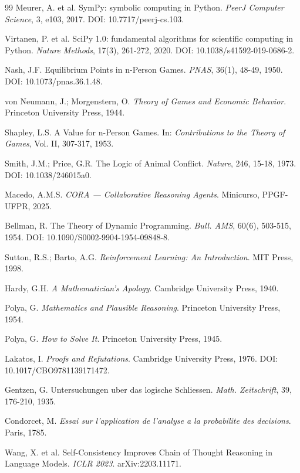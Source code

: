 \documentclass[5p]{elsarticle}
\begin{document}
\begin{thebibliography}{99}
Meurer, A. et al. SymPy: symbolic computing in Python. \textit{PeerJ Computer Science}, 3, e103, 2017. DOI: 10.7717/peerj-cs.103.

Virtanen, P. et al. SciPy 1.0: fundamental algorithms for scientific computing in Python. \textit{Nature Methods}, 17(3), 261-272, 2020. DOI: 10.1038/s41592-019-0686-2.

Nash, J.F. Equilibrium Points in n-Person Games. \textit{PNAS}, 36(1), 48-49, 1950. DOI: 10.1073/pnas.36.1.48.

von Neumann, J.; Morgenstern, O. \textit{Theory of Games and Economic Behavior}. Princeton University Press, 1944.

Shapley, L.S. A Value for n-Person Games. In: \textit{Contributions to the Theory of Games}, Vol. II, 307-317, 1953.

Smith, J.M.; Price, G.R. The Logic of Animal Conflict. \textit{Nature}, 246, 15-18, 1973. DOI: 10.1038/246015a0.

Macedo, A.M.S. \textit{CORA — Collaborative Reasoning Agents}. Minicurso, PPGF-UFPR, 2025.

Bellman, R. The Theory of Dynamic Programming. \textit{Bull. AMS}, 60(6), 503-515, 1954. DOI: 10.1090/S0002-9904-1954-09848-8.

Sutton, R.S.; Barto, A.G. \textit{Reinforcement Learning: An Introduction}. MIT Press, 1998.

Hardy, G.H. \textit{A Mathematician's Apology}. Cambridge University Press, 1940.

Polya, G. \textit{Mathematics and Plausible Reasoning}. Princeton University Press, 1954.

Polya, G. \textit{How to Solve It}. Princeton University Press, 1945.

Lakatos, I. \textit{Proofs and Refutations}. Cambridge University Press, 1976. DOI: 10.1017/CBO9781139171472.

Gentzen, G. Untersuchungen uber das logische Schliessen. \textit{Math. Zeitschrift}, 39, 176-210, 1935.

Condorcet, M. \textit{Essai sur l'application de l'analyse a la probabilite des decisions}. Paris, 1785.

Wang, X. et al. Self-Consistency Improves Chain of Thought Reasoning in Language Models. \textit{ICLR 2023}. arXiv:2203.11171.


\end{thebibliography}
\end{document}
